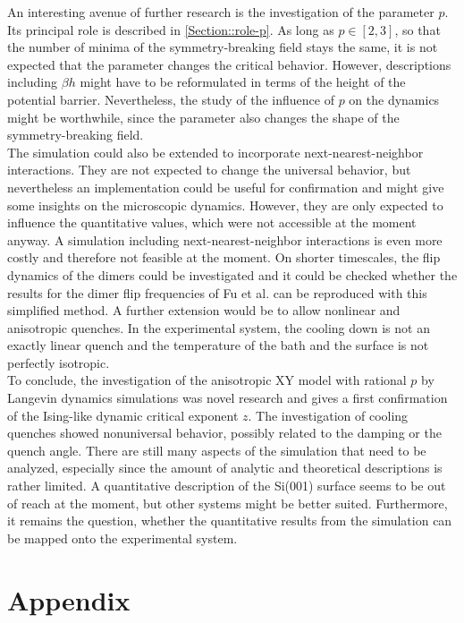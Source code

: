 	An interesting avenue of further research is the investigation of the parameter $p$. Its principal role is described in \autoref{Section::role-p}. As long as $p \in [2, 3]$, so that the number of minima of the symmetry-breaking field stays the same, it is not expected that the parameter changes the critical behavior. However, descriptions including $\beta h$ might have to be reformulated in terms of the height of the potential barrier. Nevertheless, the study of the influence of $p$ on the dynamics might be worthwhile, since the parameter also changes the shape of the symmetry-breaking field. \\ 
	
	The simulation could also be extended to incorporate next-nearest-neighbor interactions. They are not expected to change the universal behavior, but nevertheless an implementation could be useful for confirmation and might give some insights on the microscopic dynamics. However, they are only expected to influence the quantitative values, which were not accessible at the moment anyway.
	A simulation including next-nearest-neighbor interactions is even more costly and therefore not feasible at the moment. On shorter timescales, the flip dynamics of the dimers could be investigated and it could be checked whether the results for the dimer flip frequencies of Fu et al. \cite{fu2001molecular}  can be reproduced with this simplified method. A further extension would be to allow nonlinear and anisotropic quenches. In the experimental system, the cooling down is not an exactly linear quench and the temperature of the bath and the surface is not perfectly isotropic. \\
	
	To conclude, the investigation of the anisotropic XY model with rational $p$ by Langevin dynamics simulations was novel research and gives a first confirmation of the Ising-like dynamic critical exponent $z$. The investigation of cooling quenches showed nonuniversal behavior, possibly related to the damping or the quench angle. There are still many aspects of the simulation that need to be analyzed, especially since the amount of analytic and theoretical descriptions is rather limited. A quantitative description of the Si(001) surface seems to be out of reach at the moment, but other systems might be better suited. Furthermore, it remains the question, whether the quantitative results from the simulation can be mapped onto the experimental system.
	
	\appendix
	\chapter{Appendix}
